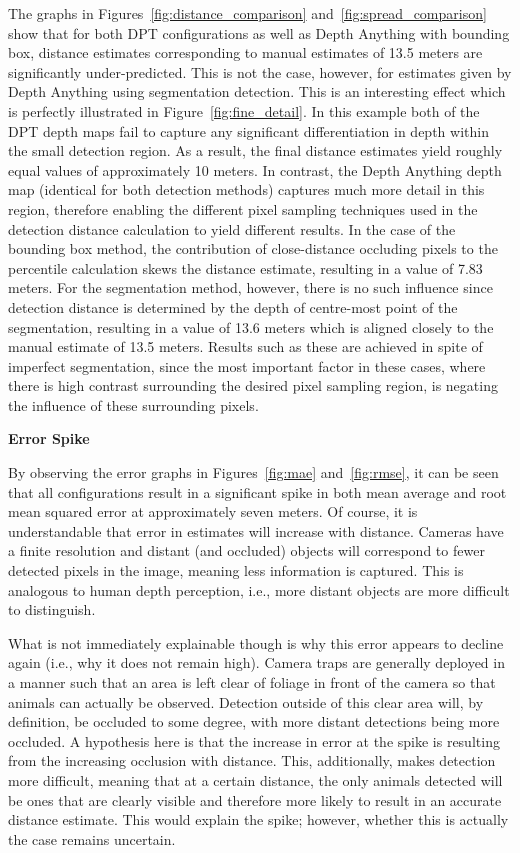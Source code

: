 The graphs in Figures~\ref{fig:distance_comparison} and~\ref{fig:spread_comparison} show that
for both DPT configurations as well as Depth Anything with bounding box, distance estimates
corresponding to manual estimates of 13.5 meters are significantly under-predicted.
This is not the case, however, for estimates given by Depth Anything using segmentation detection.
This is an interesting effect which is perfectly illustrated in Figure~\ref{fig:fine_detail}.
In this example both of the DPT depth maps fail to capture any significant differentiation in
depth within the small detection region.
As a result, the final distance estimates yield roughly equal values of approximately 10 meters.
In contrast, the Depth Anything depth map (identical for both detection methods) captures
much more detail in this region, therefore enabling the different pixel sampling techniques used
in the detection distance calculation to yield different results.
In the case of the bounding box method, the contribution of close-distance occluding pixels to the
percentile calculation skews the distance estimate, resulting in a value of 7.83 meters.
For the segmentation method, however, there is no such influence since detection distance is
determined by the depth of centre-most point of the segmentation, resulting in a value of 13.6
meters which is aligned closely to the manual estimate of 13.5 meters.
Results such as these are achieved in spite of imperfect segmentation, since the most important
factor in these cases, where there is high contrast surrounding the desired pixel sampling region,
is negating the influence of these surrounding pixels.

\vspace{5mm}
\textbf{Error Spike}

By observing the error graphs in Figures~\ref{fig:mae} and~\ref{fig:rmse}, it can be seen that all
configurations result in a significant spike in both mean average and root mean squared error at
approximately seven meters.
Of course, it is understandable that error in estimates will increase with distance.
Cameras have a finite resolution and distant (and occluded) objects will correspond to fewer
detected pixels in the image, meaning less information is captured.
This is analogous to human depth perception, i.e., more distant objects are more difficult to
distinguish.

What is not immediately explainable though is why this error appears to decline again (i.e., why
it does not remain high).
Camera traps are generally deployed in a manner such that an area is left clear of foliage in front of the
camera so that animals can actually be observed.
Detection outside of this clear area will, by definition, be occluded to some degree, with more
distant detections being more occluded.
A hypothesis here is that the increase in error at the spike is resulting from the increasing
occlusion with distance.
This, additionally, makes detection more difficult, meaning that at a certain distance, the only animals
detected will be ones that are clearly visible and therefore more likely to result in an accurate
distance estimate.
This would explain the spike; however, whether this is actually the case remains uncertain.

